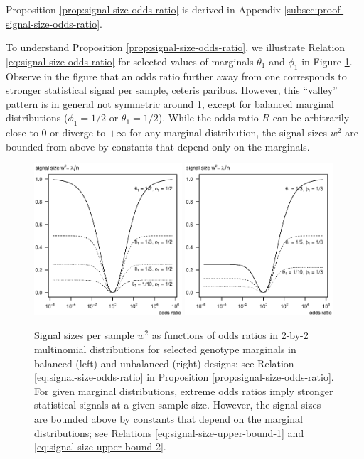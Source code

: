 Proposition \ref{prop:signal-size-odds-ratio} is derived in Appendix \ref{subsec:proof-signal-size-odds-ratio}. 

To understand Proposition \ref{prop:signal-size-odds-ratio}, we illustrate Relation \eqref{eq:signal-size-odds-ratio} for selected values of marginals $\theta_1$ and $\phi_1$ in Figure \ref{fig:signal-vs-odds}.
Observe in the figure that an odds ratio further away from one corresponds to stronger statistical signal per sample, ceteris paribus.
However, this ``valley'' pattern is in general not symmetric around 1, except for balanced marginal distributions ($\phi_1=1/2$ or $\theta_1=1/2$).
While the odds ratio $R$ can be arbitrarily close to 0 or diverge to $+\infty$ for any marginal distribution, the signal sizes $w^2$ are bounded from above by constants that depend only on the marginals.

\begin{figure}
      \centering
      \includegraphics[width=0.49\textwidth]{singal-vs-odds-p05}
      \includegraphics[width=0.49\textwidth]{singal-vs-odds-p0333}            
      \caption{Signal sizes per sample $w^2$ as functions of odds ratios in 2-by-2 multinomial distributions for selected genotype marginals in balanced (left) and unbalanced (right) designs; see Relation \eqref{eq:signal-size-odds-ratio} in Proposition \ref{prop:signal-size-odds-ratio}.
      For given marginal distributions, extreme odds ratios imply stronger statistical signals at a given sample size.
      However, the signal sizes are bounded above by constants that depend on the marginal distributions; see Relations \eqref{eq:signal-size-upper-bound-1} and \eqref{eq:signal-size-upper-bound-2}.
      } 
      \label{fig:signal-vs-odds}
\end{figure}


